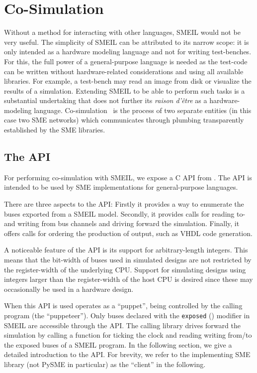\chapter{Co-Simulation}
\label{sec:cosim}

Without a method for interacting with other languages, SMEIL would not be very
useful. The simplicity of SMEIL can be attributed to its narrow scope: it is
only intended as a hardware modeling language and not for writing
test-benches. For this, the full power of a general-purpose language is needed
as the test-code can be written without hardware-related considerations and
using all available libraries. For example, a test-bench may read an image from
disk or visualize the results of a simulation. Extending SMEIL to be able to
perform such tasks is a substantial undertaking that does not further its
{\itshape raison d'être} as a hardware-modeling
language. Co-simulation~\cite{schloegl2015towards} is the process of two
separate entities (in this case two SME networks) which communicates through
plumbing transparently established by the SME libraries.

\section{The API}
For performing co-simulation with SMEIL, we expose a C API from \libsme{}. The
API is intended to be used by SME implementations for general-purpose languages.

There are three aspects to the API: Firstly it provides a way to enumerate the
buses exported from a SMEIL model. Secondly, it provides calls for reading to-
and writing from bus channels and driving forward the simulation. Finally, it
offers calls for ordering the production of output, such as VHDL code
generation.

A noticeable feature of the API is its support for arbitrary-length
integers. This means that the bit-width of buses used in simulated designs are
not restricted by the register-width of the underlying CPU. Support for
simulating designs using integers larger than the register-width of the host CPU
is desired since these may occasionally be used in a hardware design.


When this API is used \libsme{} operates as a ``puppet'', being controlled by
the calling program (the ``puppeteer''). Only buses declared with the
\texttt{exposed} () modifier in SMEIL are accessible through
the \libsme{} API. The calling library drives forward the simulation by calling
a function for ticking the clock and reading writing from/to the exposed buses
of a SMEIL program. In the following section, we give a detailed introduction to
the API.  For brevity, we refer to the implementing SME library (not PySME in
particular) as the ``client'' in the following.

